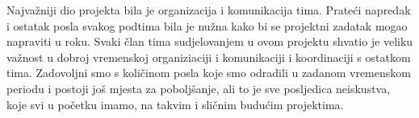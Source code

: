 		Najvažniji dio projekta bila je organizacija i komunikacija tima. Prateći napredak i ostatak posla svakog podtima bila je nužna kako bi se projektni zadatak mogao napraviti u roku. Svaki član tima sudjelovanjem u ovom projektu shvatio je veliku važnost u dobroj vremenskoj organiziaciji i komunikaciji i koordinaciji s ostatkom tima. Zadovoljni smo s količinom posla koje smo odradili u zadanom vremenskom periodu i postoji još mjesta za poboljšanje, ali to je sve posljedica neiskustva, koje svi u početku imamo, na takvim i sličnim budućim projektima. 
		
		\eject 